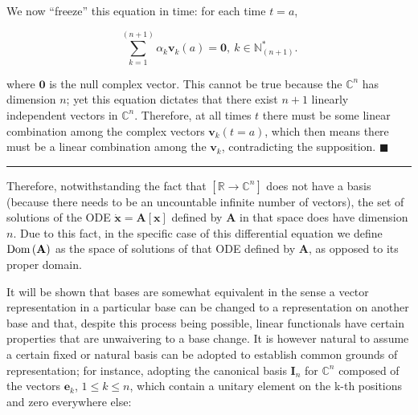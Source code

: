 	We now ``freeze'' this equation in time: for each time $t = a$,

\begin{equation} \sum_{k=1}^{(n+1)} \alpha_k \mathbf{v}_k(a) = \mathbf{0},\ k\in\mathbb{N}_{(n+1)}^* . \end{equation}

	\noindent where $\mathbf{0}$ is the null complex vector. This cannot be true because the $\mathbb{C}^n$ has dimension $n$; yet this equation dictates that there exist $n+1$ linearly independent vectors in $\mathbb{C}^n$. Therefore, at all times $t$ there must be some linear combination among the complex vectors $\mathbf{v}_k(t=a)$, which then means there must be a linear combination among the $\mathbf{v}_k$, contradicting the supposition.
\hfill$\blacksquare$
\vspace{5mm}
\hrule
\vspace{5mm} %

	Therefore, notwithstanding the fact that $\left[\mathbb{R}\to\mathbb{C}^n\right]$ does not have a basis (because there needs to be an uncountable infinite number of vectors), the set of solutions of the ODE $\dot{\mathbf{x}} = \mathbf{A}\left[\mathbf{x}\right]$ defined by $\mathbf{A}$ in that space does have dimension $n$. Due to this fact, in the specific case of this differential equation we define $\operatorname{Dom}\left(\mathbf{A}\right)$ as the space of solutions of that ODE defined by $\mathbf{A}$, as opposed to its proper domain.

	It will be shown that bases are somewhat equivalent in the sense a vector representation in a particular base can be changed to a representation on another base and that, despite this process being possible, linear functionals have certain properties that are unwaivering to a base change. It is however natural to assume a certain fixed or natural basis can be adopted to establish common grounds of representation; for instance, adopting the canonical basis $\mathbf{I}_n$ for $\mathbb{C}^n$ composed of the vectors $\mathbf{e}_k$, $1\leq k \leq n$, which contain a unitary element on the k-th positions and zero everywhere else:

